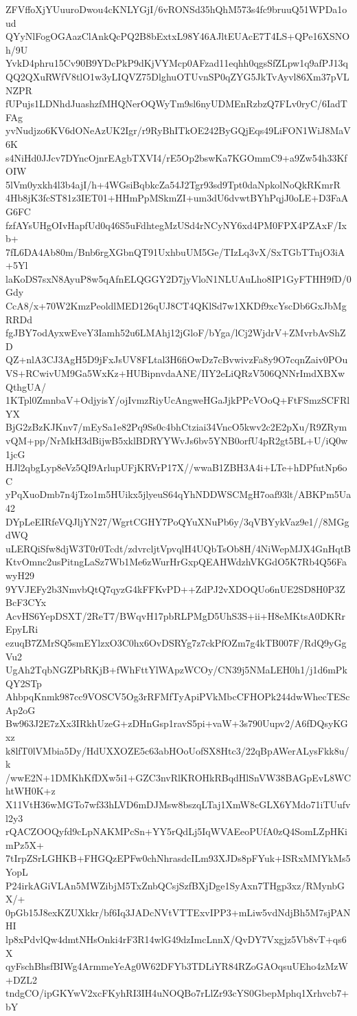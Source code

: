 ZFVffoXjYUuuroDwou4cKNLYGjI/6vRONSd35hQhM573s4fc9bruuQ51WPDa1oud
QYyNlFogOGAazClAnkQcPQ2B8bExtxL98Y46AJltEUAcE7T4LS+QPe16XSNOh/9U
YvkD4phru15Cv90B9YDcPkP9dKjVYMcp0AFzad11eqhh0qgsSfZLpw1q9afPJ13q
QQ2QXuRWfV8tlO1w3yLIQVZ75DlghuOTUvnSP0qZYG5JkTvAyvl86Xm37pVLNZPR
fUPujs1LDNhdJuashzfMHQNerOQWyTm9sl6nyUDMEnRzbzQ7FLv0ryC/6IadTFAg
yvNudjzo6KV6dONeAzUK2Igr/r9RyBhITkOE242ByGQjEqs49LiFON1WiJ8MaV6K
s4NiHd0JJcv7DYncOjnrEAgbTXVI4/rE5Op2bswKa7KGOmmC9+a9Zw54h33KfOIW
5lVm0yxkh4l3b4ajI/h+4WGsiBqbkcZa54J2Tgr93sd9Tpt0daNpkolNoQkRKmrR
4Hb8jK3fcST81z3IET01+HHmPpMSkmZI+um3dU6dvwtBYhPqjJ0oLE+D3FaAG6FC
fzfAYsUHgOIvHapfUd0q46S5uFdhtegMzUSd4rNCyNY6xd4PM0FPX4PZAxF/Ixb+
7fL6DA4Ab80m/Bnb6rgXGbnQT91UxhbuUM5Ge/TIzLq3vX/SxTGbTTnjO3iA+5Yl
laKoDS7sxN8AyuP8w5qAfnELQGGY2D7jyVloN1NLUAuLho8IP1GyFTHH9fD/0Gdy
CcA8/x+70W2KmzPeoldlMED126qUJ8CT4QKlSd7w1XKDf9xcYscDb6GxJbMgRRDd
fgJBY7odAyxwEveY3Iamh52u6LMAhj12jGloF/bYga/lCj2WjdrV+ZMvrbAvShZD
QZ+nlA3CJ3AgH5D9jFxJsUV8FLtal3H6fiOwDz7cBvwivzFa8y9O7cqnZaiv0POu
VS+RCwivUM9Ga5WxKz+HUBipnvdaANE/IIY2eLiQRzV506QNNrImdXBXwQthgUA/
1KTpl0ZmnbaV+OdjyisY/ojIvmzRiyUcAngweHGaJjkPPcVOoQ+FtFSmzSCFRlYX
BjG2zBzKJKnv7/mEySa1e82Pq9Ss0c4bhCtziai34VncO5kwv2c2E2pXu/R9ZRym
vQM+pp/NrMkH3dBijwB5xklBDRYYWvJs6bv5YNB0orfU4pR2gt5BL+U/iQ0w1jcG
HJl2qbgLyp8eVz5QI9ArlupUFjKRVrP17X//wwaB1ZBH3A4i+LTe+hDPfutNp6oC
yPqXuoDmb7n4jTzo1m5HUikx5jlyeuS64qYhNDDWSCMgH7oaf93lt/ABKPm5Ua42
DYpLeEIRfeVQJljYN27/WgrtCGHY7PoQYuXNuPb6y/3qVBYykVaz9e1//8MGgdWQ
uLERQiSfw8djW3T0r0Tcdt/zdvrcljtVpvqlH4UQbTsOb8H/4NiWepMJX4GnHqtB
KtvOmnc2usPitngLaSz7Wb1Me6zWurHrGxpQEAHWdzhVKGdO5K7Rb4Q56FawyH29
9YVJEFy2b3NmvbQtQ7qyzG4kFFKvPD++ZdPJ2vXDOQUo6nUE2SD8H0P3ZBcF3CYx
AcvHS6YepDSXT/2ReT7/BWqvH17pbRLPMgD5UhS3S+ii+H8eMKtsA0DKRrEpyLRi
ezuqB7ZMrSQ5smEYlzxO3C0hx6OvDSRYg7z7ckPfOZm7g4kTB007F/RdQ9yGgVu2
UgAh2TqbNGZPbRKjB+fWhFttYlWApzWCOy/CN39j5NMaLEH0h1/j1d6mPkQY2STp
AhbpqKnmk987cc9VOSCV5Og3rRFMfTyApiPVkMbcCFHOPk244dwWhecTEScAp2oG
Bw963J2E7zXx3IRkhUzeG+zDHnGsp1ravS5pi+vaW+3s790Uupv2/A6fDQsyKGxz
k8lfT0lVMbia5Dy/HdUXXOZE5c63abHOoUofSX8Htc3/22qBpAWerALysFkk8u/k
/wwE2N+1DMKhKfDXw5i1+GZC3nvRlKROHkRBqdHlSnVW38BAGpEvL8WChtWH0K+z
X11VtH36wMGTo7wf33hLVD6mDJMsw8bszqLTaj1XmW8cGLX6YMdo71iTUufvl2y3
rQACZOOQyfd9cLpNAKMPcSn+YY5rQdLj5IqWVAEeoPUfA0zQ4SomLZpHKimPz5X+
7tIrpZSrLGHKB+FHGQzEPFw0chNhrasdcILm93XJDs8pFYuk+ISRxMMYkMs5YopL
P24irkAGiVLAn5MWZibjM5TxZnbQCsjSzfBXjDge1SyAxn7THgp3xz/RMynbGX/+
0pGb15J8exKZUXkkr/bf6Iq3JADcNVtVTTExvIPP3+mLiw5vdNdjBh5M7sjPANHI
lp8xPdvlQw4dmtNHsOnki4rF3R14wlG49dzImcLnnX/QvDY7Vxgjz5Vb8vT+qs6X
qyFschBhsfBIWg4ArmmeYeAg0W62DFYb3TDLiYR84RZoGAOqsuUEho4zMzW+DZL2
tndgCO/ipGKYwV2xcFKyhRI3IH4uNOQBo7rLlZr93cYS0GbepMphq1Xrhvcb7+bY
